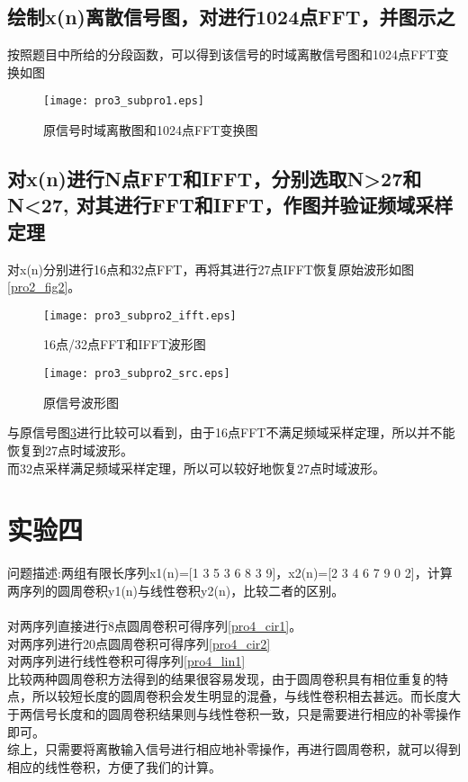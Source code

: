 \documentclass[fleqn,10pt]{SelfArx} %
\begin{document}
\begin{CJK}{UTF8}{gkai}
\subsection{绘制x(n)离散信号图，对进行1024点FFT，并图示之}
按照题目中所给的分段函数，可以得到该信号的时域离散信号图和1024点FFT变换如图
\begin{figure}
  \centering
  \texttt{[image: pro3\_subpro1.eps]}
  \caption{原信号时域离散图和1024点FFT变换图}
  \label{pro3_fig1}
\end{figure}
\subsection{对x(n)进行N点FFT和IFFT，分别选取N>27和N<27, 对其进行FFT和IFFT，作图并验证频域采样定理}
对x(n)分别进行16点和32点FFT，再将其进行27点IFFT恢复原始波形如图\ref{pro2_fig2}。
\begin{figure}
  \centering
  \texttt{[image: pro3\_subpro2\_ifft.eps]}
  \caption{16点/32点FFT和IFFT波形图}
  \label{pro3_fig2}
\end{figure}
\begin{figure}
  \centering
  \texttt{[image: pro3\_subpro2\_src.eps]}
  \caption{原信号波形图}
  \label{pro3_fig3}
\end{figure}
与原信号图\ref{pro3_fig3}进行比较可以看到，由于16点FFT不满足频域采样定理，所以并不能恢复到27点时域波形。\\
而32点采样满足频域采样定理，所以可以较好地恢复27点时域波形。
\section{实验四}
问题描述:两组有限长序列x1(n)=[1 3 5 3 6 8 3 9]，x2(n)=[2 3 4 6 7 9 0 2]，计算两序列的圆周卷积y1(n)与线性卷积y2(n)，比较二者的区别。\\\\
对两序列直接进行8点圆周卷积可得序列\ref{pro4_cir1}。
\begin{equation}
  \label{pro4_cir1}
\end{equation}
对两序列进行20点圆周卷积可得序列\ref{pro4_cir2}
\begin{equation}
  \label{pro4_cir2}
\end{equation}
对两序列进行线性卷积可得序列\ref{pro4_lin1}
\begin{equation}
  \label{pro4_lin1}
\end{equation}
比较两种圆周卷积方法得到的结果很容易发现，由于圆周卷积具有相位重复的特点，所以较短长度的圆周卷积会发生明显的混叠，与线性卷积相去甚远。而长度大于两信号长度和的圆周卷积结果则与线性卷积一致，只是需要进行相应的补零操作即可。\\
综上，只需要将离散输入信号进行相应地补零操作，再进行圆周卷积，就可以得到相应的线性卷积，方便了我们的计算。

\end{CJK}
\end{document}
